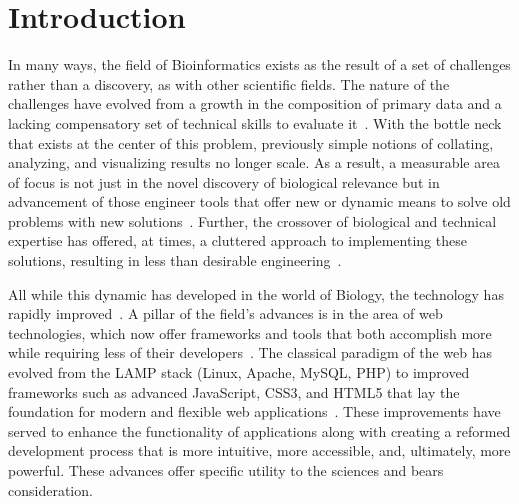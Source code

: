 \documentclass[10pt]{report}
\begin{document}
\newpage






\chapter{Introduction}
In many ways, the field of Bioinformatics exists as the result of a set of challenges rather than a discovery, as with other scientific fields. The nature of the challenges have evolved from a growth in the composition of primary data and a lacking compensatory set of technical skills to evaluate it~\cite{lawlorEngineeringBioinformaticsBuilding2015}. With the bottle neck that exists at the center of this problem, previously simple notions of collating, analyzing, and visualizing results no longer scale. As a result, a measurable area of focus is not just in the novel discovery of biological relevance but in advancement of those engineer tools that offer new or dynamic means to solve old problems with new solutions~\cite{segalDevelopingScientificSoftware2008}. Further, the crossover of biological and technical expertise has offered, at times, a cluttered approach to implementing these solutions, resulting in less than desirable engineering~\cite{vermaLackSoftwareEngineering2013}.

All while this dynamic has developed in the world of Biology, the technology has rapidly improved~\cite{teufelCurrentBioinformaticsTools2006}. A pillar of the field's advances is in the area of web technologies, which now offer frameworks and tools that both accomplish more while requiring less of their developers~\cite{managementassociationBioinformaticsConceptsMethodologies2013a}. The classical paradigm of the web has evolved from the LAMP stack (Linux, Apache, MySQL, PHP) to improved frameworks such as advanced JavaScript, CSS3, and HTML5 that lay the foundation for modern and flexible web applications~\cite{wangOpenSourceLibraries2015}. These improvements have served to enhance the functionality of applications along with creating a reformed development process that is more intuitive, more accessible, and, ultimately, more powerful. These advances offer specific utility to the sciences and bears consideration.
\end{document}

